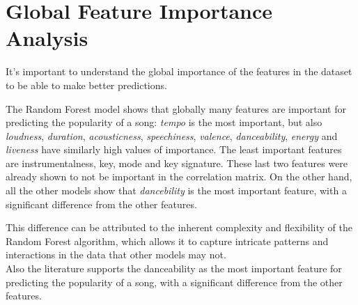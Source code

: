 \section{Global Feature Importance Analysis}

It's important to understand the global importance of the features in the dataset to be able to make better predictions.

The Random Forest model shows that globally many features are important for predicting the popularity of a song: \textit{tempo} is the most important, but also \textit{loudness}, \textit{duration}, \textit{acousticness}, \textit{speechiness}, \textit{valence}, \textit{danceability}, \textit{energy} and \textit{liveness} have similarly high values of importance. The least important features are instrumentalness, key, mode and key signature. These last two features were already shown to not be important in the correlation matrix.
On the other hand, all the other models show that 
\textit{dancebility} is the most important feature, with a significant difference from the other features.

This difference can be attributed to the inherent complexity and flexibility of the Random Forest
algorithm, which allows it to capture intricate patterns and interactions in the data that other models may not.\\
Also the literature supports the danceability as the most important feature for predicting the popularity of a song, with a significant difference from the other features.\\





